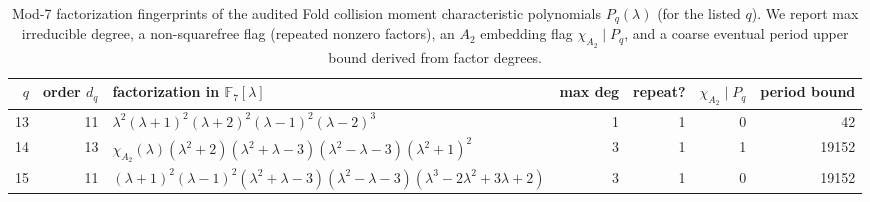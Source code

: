 \begin{table}[H]
\centering
\scriptsize
\setlength{\tabcolsep}{5pt}
\caption{Mod-7 factorization fingerprints of the audited Fold collision moment characteristic polynomials $P_q(\lambda)$ (for the listed $q$). We report max irreducible degree, a non-squarefree flag (repeated nonzero factors), an $A_2$ embedding flag $\chi_{A_2}\mid P_q$, and a coarse eventual period upper bound derived from factor degrees.}
\label{tab:fold_collision_charpoly_mod7_selection_q13_15}
\begin{tabular}{r r l r r r r}
\toprule
$q$ & order $d_q$ & factorization in $\mathbb{F}_{7}[\lambda]$ & max deg & repeat? & $\chi_{A_2}\mid P_q$ & period bound\\
\midrule
13 & 11 & $\lambda^{2} \left(\lambda + 1\right)^{2} \left(\lambda + 2\right)^{2} \left(\lambda - 1\right)^{2} \left(\lambda - 2\right)^{3}$ & 1 & 1 & 0 & 42\\
14 & 13 & $\chi_{A_2}(\lambda) \left(\lambda^{2} + 2\right) \left(\lambda^{2} + \lambda - 3\right) \left(\lambda^{2} - \lambda - 3\right) \left(\lambda^{2} + 1\right)^{2}$ & 3 & 1 & 1 & 19152\\
15 & 11 & $\left(\lambda + 1\right)^{2} \left(\lambda - 1\right)^{2} \left(\lambda^{2} + \lambda - 3\right) \left(\lambda^{2} - \lambda - 3\right) \left(\lambda^{3} - 2\lambda^{2} + 3\lambda + 2\right)$ & 3 & 1 & 0 & 19152\\
\bottomrule
\end{tabular}
\end{table}
